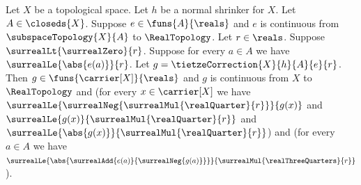 \begin{theorem}\label{tietze_quarter_correction}
    Let $X$ be a topological space.
    Let $h$ be a normal shrinker for $X$.
    Let $A\in\closeds{X}$.
    Suppose $e\in\funs{A}{\reals}$ and
        $e$ is continuous from $\subspaceTopology{X}{A}$ to
            $\RealTopology$.
    Let $r\in\reals$.
    Suppose $\surrealLt{\surrealZero}{r}$.
    Suppose for every $a\in A$ we have
        $\surrealLe{\abs{e(a)}}{r}$.
    Let $g=\tietzeCorrection{X}{h}{A}{e}{r}$.
    Then $g\in\funs{\carrier[X]}{\reals}$ and
        $g$ is continuous from $X$ to $\RealTopology$ and
        (for every $x\in\carrier[X]$ we have
            $\surrealLe{\surrealNeg{\surrealMul{\realQuarter}{r}}}
                {g(x)}$ and
            $\surrealLe{g(x)}{\surrealMul{\realQuarter}{r}}$ and
            $\surrealLe{\abs{g(x)}}
                {\surrealMul{\realQuarter}{r}}$) and
        (for every $a\in A$ we have
            $\surrealLe{\abs{\surrealAdd{e(a)}{\surrealNeg{g(a)}}}}
                {\surrealMul{\realThreeQuarters}{r}}$).
\end{theorem}

